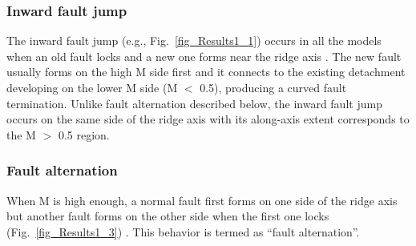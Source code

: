 \subsubsection{Inward fault jump}
The inward fault jump (e.g., Fig.~\hyperref[fig_Results1_1]{\ref{fig_Results1_1}}) occurs in all the models when an old fault locks and a new one forms near the ridge axis \citep[e.g.,][]{Lavier2000, Olive2014}.
%
The new fault usually forms on the high M side first and it connects to the existing detachment developing on the lower M side (M $<$ 0.5), producing a curved fault termination. Unlike fault alternation described below, the inward fault jump occurs on the same side of the ridge axis with its along-axis extent corresponds to the M $>$ 0.5 region. %

\subsubsection{Fault alternation}
When M is high enough, a normal fault first forms on one side of the ridge axis but another fault forms on the other side when the first one locks (Fig.~\hyperref[fig_Results1_3]{\ref{fig_Results1_3}}) \citep{Buck2005,Tucholke2008}. This behavior is termed as ``fault alternation''. %

